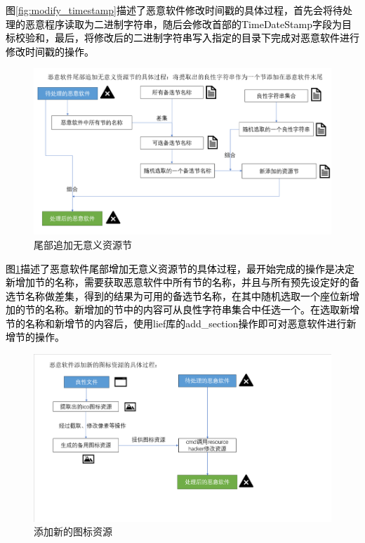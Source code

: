 \textcolor{black}{图\ref{fig:modify_timestamp}描述了恶意软件修改时间戳的具体过程，首先会将待处理的恶意程序读取为二进制字符串，随后会修改首部的TimeDateStamp字段为目标校验和，最后，将修改后的二进制字符串写入指定的目录下完成对恶意软件进行修改时间戳的操作。}

\begin{figure}[htbp]
  \centering
  \includegraphics[]{images/append_benign_sections.png}
  \caption{尾部追加无意义资源节}\label{fig:append_benign_sections}
\end{figure}

\textcolor{black}{图\ref{fig:append_benign_sections}描述了恶意软件尾部增加无意义资源节的具体过程，最开始完成的操作是决定新增加节的名称，需要获取恶意软件中所有节的名称，并且与所有预先设定好的备选节名称做差集，得到的结果为可用的备选节名称，在其中随机选取一个座位新增加的节的名称。新增加的节中的内容可从良性字符串集合中任选一个。在选取新增节的名称和新增节的内容后，使用lief库的add\_section操作即可对恶意软件进行新增节的操作。}

\begin{figure}[htbp]
  \centering
  \includegraphics[]{images/add_resources.png}
  \caption{添加新的图标资源}\label{fig:add_resources}
\end{figure}

